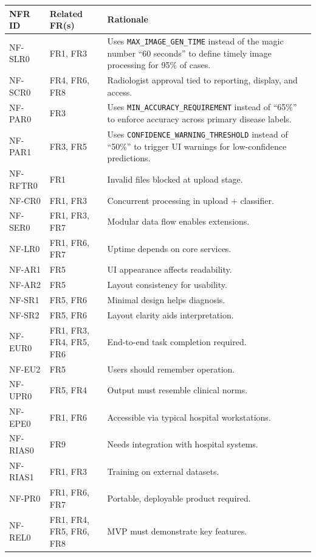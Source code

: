 \documentclass[12pt]{article}
\begin{document}
\small
\renewcommand{\arraystretch}{1.2}
\begin{tabularx}{\textwidth}{|l|l|X|}
\hline
\textbf{NFR ID} & \textbf{Related FR(s)} & \textbf{Rationale} \\
\hline
NF-SLR0 & FR1, FR3 & Uses \texttt{MAX\_IMAGE\_GEN\_TIME} instead of the magic number ``60 seconds'' to define timely image processing for 95\% of cases. \\
\hline
NF-SCR0 & FR4, FR6, FR8 & Radiologist approval tied to reporting, display, and access. \\
\hline
NF-PAR0 & FR3 & Uses \texttt{MIN\_ACCURACY\_REQUIREMENT} instead of ``65\%'' to enforce accuracy across primary disease labels. \\
\hline
NF-PAR1 & FR3, FR5 & Uses \texttt{CONFIDENCE\_WARNING\_THRESHOLD} instead of ``50\%'' to trigger UI warnings for low-confidence predictions. \\
\hline
NF-RFTR0 & FR1 & Invalid files blocked at upload stage. \\
\hline
NF-CR0 & FR1, FR3 & Concurrent processing in upload + classifier. \\
\hline
NF-SER0 & FR1, FR3, FR7 & Modular data flow enables extensions. \\
\hline
NF-LR0 & FR1, FR6, FR7 & Uptime depends on core services. \\
\hline
NF-AR1 & FR5 & UI appearance affects readability. \\
\hline
NF-AR2 & FR5 & Layout consistency for usability. \\
\hline
NF-SR1 & FR5, FR6 & Minimal design helps diagnosis. \\
\hline
NF-SR2 & FR5, FR6 & Layout clarity aids interpretation. \\
\hline
NF-EUR0 & FR1, FR3, FR4, FR5, FR6 & End-to-end task completion required. \\
\hline
NF-EU2 & FR5 & Users should remember operation. \\
\hline
NF-UPR0 & FR5, FR4 & Output must resemble clinical norms. \\
\hline
NF-EPE0 & FR1, FR6 & Accessible via typical hospital workstations. \\
\hline
NF-RIAS0 & FR9 & Needs integration with hospital systems. \\
\hline
NF-RIAS1 & FR1, FR3 & Training on external datasets. \\
\hline
NF-PR0 & FR1, FR6, FR7 & Portable, deployable product required. \\
\hline
NF-REL0 & FR1, FR4, FR5, FR6, FR8 & MVP must demonstrate key features. \\

\end{tabularx}
\end{document}
